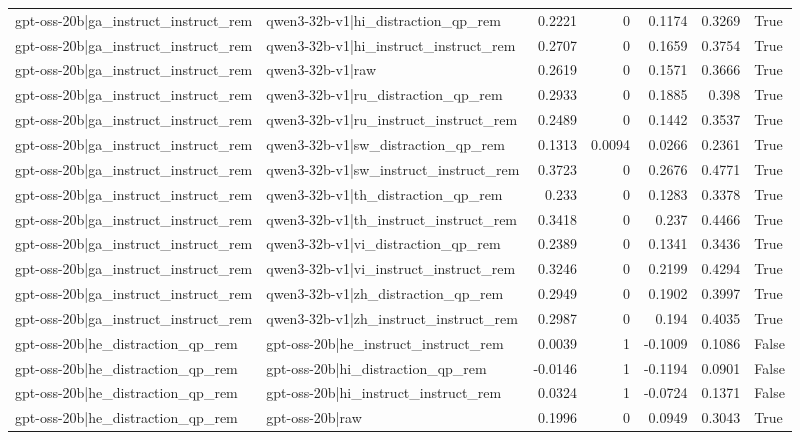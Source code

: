 \begin{table}
\begin{tabular}{l l r r r r l}
gpt-oss-20b|ga_instruct_instruct_rem & qwen3-32b-v1|hi_distraction_qp_rem & 0.2221 & 0 & 0.1174 & 0.3269 & True \\
gpt-oss-20b|ga_instruct_instruct_rem & qwen3-32b-v1|hi_instruct_instruct_rem & 0.2707 & 0 & 0.1659 & 0.3754 & True \\
gpt-oss-20b|ga_instruct_instruct_rem & qwen3-32b-v1|raw & 0.2619 & 0 & 0.1571 & 0.3666 & True \\
gpt-oss-20b|ga_instruct_instruct_rem & qwen3-32b-v1|ru_distraction_qp_rem & 0.2933 & 0 & 0.1885 & 0.398 & True \\
gpt-oss-20b|ga_instruct_instruct_rem & qwen3-32b-v1|ru_instruct_instruct_rem & 0.2489 & 0 & 0.1442 & 0.3537 & True \\
gpt-oss-20b|ga_instruct_instruct_rem & qwen3-32b-v1|sw_distraction_qp_rem & 0.1313 & 0.0094 & 0.0266 & 0.2361 & True \\
gpt-oss-20b|ga_instruct_instruct_rem & qwen3-32b-v1|sw_instruct_instruct_rem & 0.3723 & 0 & 0.2676 & 0.4771 & True \\
gpt-oss-20b|ga_instruct_instruct_rem & qwen3-32b-v1|th_distraction_qp_rem & 0.233 & 0 & 0.1283 & 0.3378 & True \\
gpt-oss-20b|ga_instruct_instruct_rem & qwen3-32b-v1|th_instruct_instruct_rem & 0.3418 & 0 & 0.237 & 0.4466 & True \\
gpt-oss-20b|ga_instruct_instruct_rem & qwen3-32b-v1|vi_distraction_qp_rem & 0.2389 & 0 & 0.1341 & 0.3436 & True \\
gpt-oss-20b|ga_instruct_instruct_rem & qwen3-32b-v1|vi_instruct_instruct_rem & 0.3246 & 0 & 0.2199 & 0.4294 & True \\
gpt-oss-20b|ga_instruct_instruct_rem & qwen3-32b-v1|zh_distraction_qp_rem & 0.2949 & 0 & 0.1902 & 0.3997 & True \\
gpt-oss-20b|ga_instruct_instruct_rem & qwen3-32b-v1|zh_instruct_instruct_rem & 0.2987 & 0 & 0.194 & 0.4035 & True \\
gpt-oss-20b|he_distraction_qp_rem & gpt-oss-20b|he_instruct_instruct_rem & 0.0039 & 1 & -0.1009 & 0.1086 & False \\
gpt-oss-20b|he_distraction_qp_rem & gpt-oss-20b|hi_distraction_qp_rem & -0.0146 & 1 & -0.1194 & 0.0901 & False \\
gpt-oss-20b|he_distraction_qp_rem & gpt-oss-20b|hi_instruct_instruct_rem & 0.0324 & 1 & -0.0724 & 0.1371 & False \\
gpt-oss-20b|he_distraction_qp_rem & gpt-oss-20b|raw & 0.1996 & 0 & 0.0949 & 0.3043 & True \\

\end{tabular}
\end{table}

